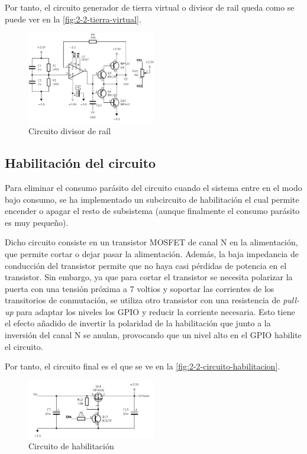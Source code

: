 Por tanto, el circuito generador de tierra virtual o divisor de rail queda como se puede ver en la \autoref{fig:2-2-tierra-virtual}.

\begin{figure}[h]
    \centering
    \includegraphics[width=0.5\textwidth]{images/2/2-2/circuitoDivisorRail.png}
    \caption{Circuito divisor de raíl}
    \label{fig:2-2-tierra-virtual}
\end{figure}

\subsection{Habilitación del circuito}

Para eliminar el consumo parásito del circuito cuando el sistema entre en el modo bajo consumo, se ha implementado un subcircuito de habilitación el cual permite encender o apagar el resto de subsistema (aunque finalmente el consumo parásito es muy pequeño).

Dicho circuito consiste en un transistor MOSFET de canal N en la alimentación, que permite cortar o dejar pasar la alimentación. Además, la baja impedancia de conducción del transistor permite que no haya casi pérdidas de potencia en el transistor. Sin embargo, ya que para cortar el transistor se necesita polarizar la puerta con una tensión próxima a 7 voltios y soportar las corrientes de los transitorios de conmutación, se utiliza otro transistor con una resistencia de \textit{pull-up} para adaptar los niveles los GPIO y reducir la corriente necesaria. Esto tiene el efecto añadido de invertir la polaridad de la habilitación que junto a la inversión del canal N se anulan, provocando que un nivel alto en el GPIO habilite el circuito. 

Por tanto, el circuito final es el que se ve en la \autoref{fig:2-2-circuito-habilitacion}.

\begin{figure}[h]
    \centering
    \includegraphics[width=0.5\textwidth]{images/2/2-2/circuitoHabilitacion.png}
    \caption{Circuito de habilitación}
    \label{fig:2-2-circuito-habilitacion}
\end{figure}

